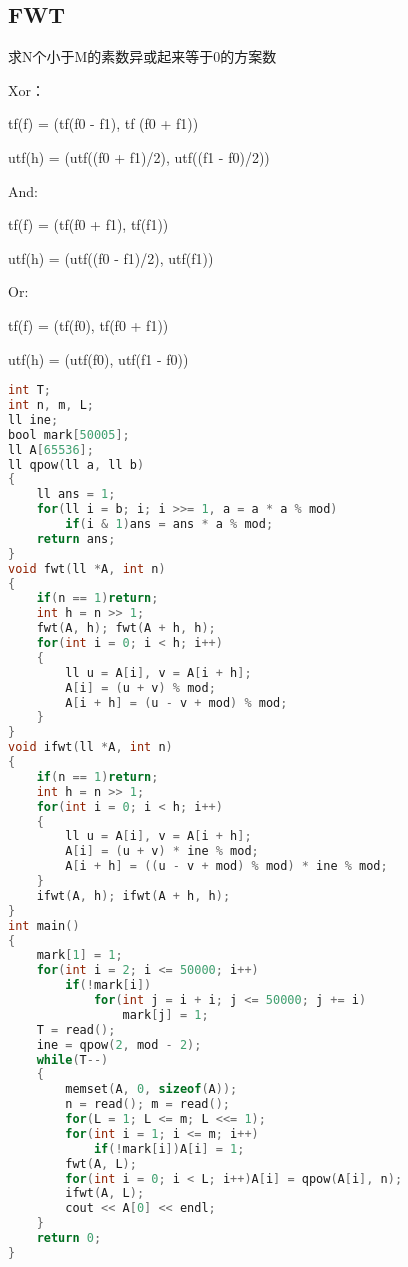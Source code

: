 \subsection{FWT}
求N个小于M的素数异或起来等于0的方案数

Xor：

tf(f) = (tf(f0 - f1), tf (f0 + f1))

utf(h) = (utf((f0 + f1)/2), utf((f1 - f0)/2))

And:

tf(f) = (tf(f0 + f1), tf(f1))

utf(h) = (utf((f0 - f1)/2), utf(f1))

Or:

tf(f) = (tf(f0), tf(f0 + f1))

utf(h) = (utf(f0), utf(f1 - f0))
\begin{lstlisting}[language=C]
int T;
int n, m, L;
ll ine;
bool mark[50005];
ll A[65536];
ll qpow(ll a, ll b)
{
    ll ans = 1;
    for(ll i = b; i; i >>= 1, a = a * a % mod)
        if(i & 1)ans = ans * a % mod;
    return ans;
}
void fwt(ll *A, int n)
{
    if(n == 1)return;
    int h = n >> 1;
    fwt(A, h); fwt(A + h, h);
    for(int i = 0; i < h; i++)
    {
        ll u = A[i], v = A[i + h];
        A[i] = (u + v) % mod;
        A[i + h] = (u - v + mod) % mod;
    }
}
void ifwt(ll *A, int n)
{
    if(n == 1)return;
    int h = n >> 1;
    for(int i = 0; i < h; i++)
    {
        ll u = A[i], v = A[i + h];
        A[i] = (u + v) * ine % mod;
        A[i + h] = ((u - v + mod) % mod) * ine % mod;
    }
    ifwt(A, h); ifwt(A + h, h);
}
int main()
{
    mark[1] = 1;
    for(int i = 2; i <= 50000; i++)
        if(!mark[i])
            for(int j = i + i; j <= 50000; j += i)
                mark[j] = 1;
    T = read();
    ine = qpow(2, mod - 2);
    while(T--)
    {
        memset(A, 0, sizeof(A));
        n = read(); m = read();
        for(L = 1; L <= m; L <<= 1);
        for(int i = 1; i <= m; i++)
            if(!mark[i])A[i] = 1;
        fwt(A, L);
        for(int i = 0; i < L; i++)A[i] = qpow(A[i], n);
        ifwt(A, L);
        cout << A[0] << endl;
    }
    return 0;
}
\end{lstlisting}